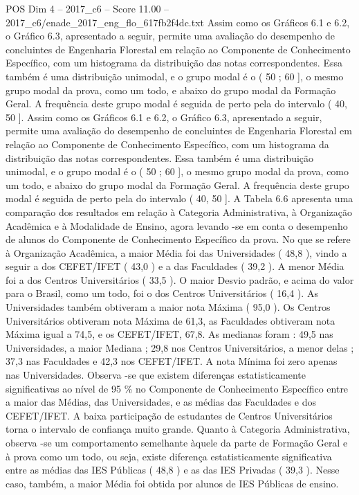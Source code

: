 \begin{textsample}{POS Dim 4 – 2017\_c6 – Score 11.00 – 2017\_c6/enade\_2017\_eng\_flo\_617fb2f4dc.txt}
Assim como os Gráficos 6.1 e 6.2, o Gráfico 6.3, apresentado a seguir, permite uma avaliação do desempenho de concluintes de Engenharia Florestal em relação ao Componente de Conhecimento Específico, com um histograma da distribuição das notas correspondentes.
Essa também é uma distribuição unimodal, e o grupo modal é o ( 50 ; 60 ], o mesmo grupo modal da prova, como um todo, e abaixo do grupo modal da Formação Geral.
A frequência deste grupo modal é seguida de perto pela do intervalo ( 40, 50 ].
Assim como os Gráficos 6.1 e 6.2, o Gráfico 6.3, apresentado a seguir, permite uma avaliação do desempenho de concluintes de Engenharia Florestal em relação ao Componente de Conhecimento Específico, com um histograma da distribuição das notas correspondentes.
Essa também é uma distribuição unimodal, e o grupo modal é o ( 50 ; 60 ], o mesmo grupo modal da prova, como um todo, e abaixo do grupo modal da Formação Geral.
A frequência deste grupo modal é seguida de perto pela do intervalo ( 40, 50 ].
A Tabela 6.6 apresenta uma comparação dos resultados em relação à Categoria Administrativa, à Organização Acadêmica e à Modalidade de Ensino, agora levando -se em conta o desempenho de alunos do Componente de Conhecimento Específico da prova.
No que se refere à Organização Acadêmica, a maior Média foi das Universidades ( 48,8 ), vindo a seguir a dos CEFET/IFET ( 43,0 ) e a das Faculdades ( 39,2 ).
A menor Média foi a dos Centros Universitários ( 33,5 ).
O maior Desvio padrão, e acima do valor para o Brasil, como um todo, foi o dos Centros Universitários ( 16,4 ).
As Universidades também obtiveram a maior nota Máxima ( 95,0 ).
Os Centros Universitários obtiveram nota Máxima de 61,3, as Faculdades obtiveram nota Máxima igual a 74,5, e os CEFET/IFET, 67,8.
As medianas foram : 49,5 nas Universidades, a maior Mediana ; 29,8 nos Centros Universitários, a menor delas ; 37,3 nas Faculdades e 42,3 nos CEFET/IFET.
A nota Mínima foi zero apenas nas Universidades.
Observa -se que existem diferenças estatisticamente significativas ao nível de 95 \% no Componente de Conhecimento Específico entre a maior das Médias, das Universidades, e as médias das Faculdades e dos CEFET/IFET.
A baixa participação de estudantes de Centros Universitários torna o intervalo de confiança muito grande.
Quanto à Categoria Administrativa, observa -se um comportamento semelhante àquele da parte de Formação Geral e à prova como um todo, ou seja, existe diferença estatisticamente significativa entre as médias das IES Públicas ( 48,8 ) e as das IES Privadas ( 39,3 ).
Nesse caso, também, a maior Média foi obtida por alunos de IES Públicas de ensino.

\end{textsample}
